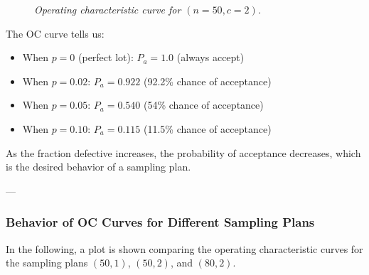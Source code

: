 \documentclass[twoside]{book}
\begin{document}
\begin{figure}[H]
\centering
{}
\caption{\textit{Operating characteristic curve for $(n=50, c=2)$.}}
\end{figure}

The OC curve tells us:
\begin{itemize}
    \item When $p = 0$ (perfect lot): $P_a = 1.0$ (always accept)
    \item When $p = 0.02$: $P_a = 0.922$ (92.2\% chance of acceptance)
    \item When $p = 0.05$: $P_a = 0.540$ (54\% chance of acceptance)
    \item When $p = 0.10$: $P_a = 0.115$ (11.5\% chance of acceptance)
\end{itemize}

As the fraction defective increases, the probability of acceptance decreases, which is the desired behavior of a sampling plan.

---

\subsubsection*{Behavior of OC Curves for Different Sampling Plans}

In the following, a plot is shown comparing the operating characteristic curves for the sampling plans \((50,1)\), \((50,2)\), and \((80,2)\).
\end{document}
